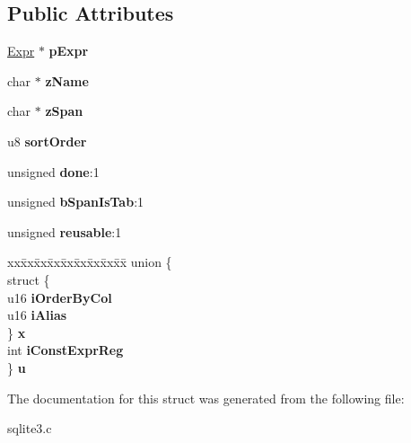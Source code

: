 \subsection*{Public Attributes}
\begin{DoxyCompactItemize}
\item 
\hyperlink{structExpr}{Expr} $\ast$ {\bfseries p\+Expr}\hypertarget{structExprList_1_1ExprList__item_a75906cf3ff19e5bf16373fec7f3c79ad}{}\label{structExprList_1_1ExprList__item_a75906cf3ff19e5bf16373fec7f3c79ad}

\item 
char $\ast$ {\bfseries z\+Name}\hypertarget{structExprList_1_1ExprList__item_af278eb03a1169c73d144547adaf9b04f}{}\label{structExprList_1_1ExprList__item_af278eb03a1169c73d144547adaf9b04f}

\item 
char $\ast$ {\bfseries z\+Span}\hypertarget{structExprList_1_1ExprList__item_ade485bb6fafb44ec2aba59d05b8d117b}{}\label{structExprList_1_1ExprList__item_ade485bb6fafb44ec2aba59d05b8d117b}

\item 
u8 {\bfseries sort\+Order}\hypertarget{structExprList_1_1ExprList__item_af9084dc073f96792c0c7a8a894778881}{}\label{structExprList_1_1ExprList__item_af9084dc073f96792c0c7a8a894778881}

\item 
unsigned {\bfseries done}\+:1\hypertarget{structExprList_1_1ExprList__item_a0100abfbd214ec2199dd25e4bce05dcb}{}\label{structExprList_1_1ExprList__item_a0100abfbd214ec2199dd25e4bce05dcb}

\item 
unsigned {\bfseries b\+Span\+Is\+Tab}\+:1\hypertarget{structExprList_1_1ExprList__item_a05e84a6dbbf69cea042d3bf888955999}{}\label{structExprList_1_1ExprList__item_a05e84a6dbbf69cea042d3bf888955999}

\item 
unsigned {\bfseries reusable}\+:1\hypertarget{structExprList_1_1ExprList__item_a066f924fb690e78cd2833770f737a13b}{}\label{structExprList_1_1ExprList__item_a066f924fb690e78cd2833770f737a13b}

\item 
\begin{tabbing}
xx\=xx\=xx\=xx\=xx\=xx\=xx\=xx\=xx\=\kill
union \{\\
\>struct \{\\
\>\>u16 {\bfseries iOrderByCol}\\
\>\>u16 {\bfseries iAlias}\\
\>\} {\bfseries x}\\
\>int {\bfseries iConstExprReg}\\
\} {\bfseries u}\hypertarget{structExprList_1_1ExprList__item_a7bce1eb19061edb080a38a6b826fd789}{}\label{structExprList_1_1ExprList__item_a7bce1eb19061edb080a38a6b826fd789}
\\

\end{tabbing}\end{DoxyCompactItemize}


The documentation for this struct was generated from the following file\+:\begin{DoxyCompactItemize}
\item 
sqlite3.\+c\end{DoxyCompactItemize}

